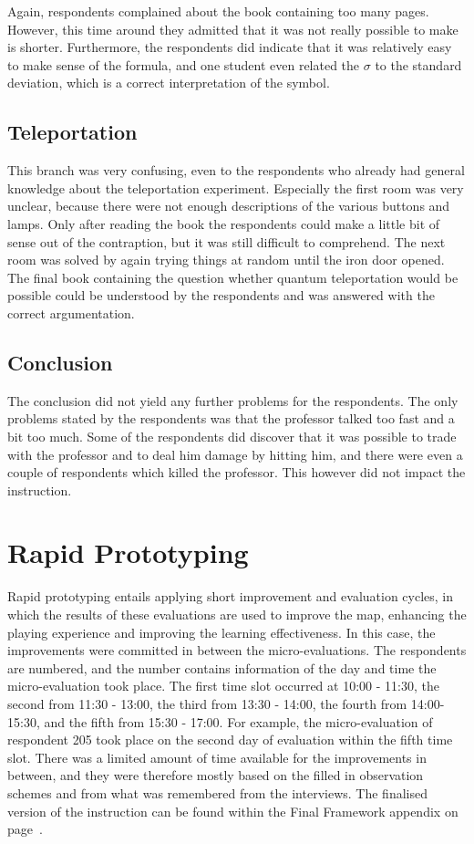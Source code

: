 \documentclass[11pt,twoside]{report} %
\begin{document}
Again, respondents complained about the book containing too many pages. However, this time around they admitted that it was not really possible to make is shorter. Furthermore, the respondents did indicate that it was relatively easy to make sense of the formula, and one student even related the $\sigma$ to the standard deviation, which is a correct interpretation of the symbol.

\subsection{Teleportation}

This branch was very confusing, even to the respondents who already had general knowledge about the teleportation experiment. Especially the first room was very unclear, because there were not enough descriptions of the various buttons and lamps. Only after reading the book the respondents could make a little bit of sense out of the contraption, but it was still difficult to comprehend. The next room was solved by again trying things at random until the iron door opened. The final book containing the question whether quantum teleportation would be possible could be understood by the respondents and was answered with the correct argumentation.

\subsection{Conclusion}

The conclusion did not yield any further problems for the respondents. The only problems stated by the respondents was that the professor talked too fast and a bit too much. Some of the respondents did discover that it was possible to trade with the professor and to deal him damage by hitting him, and there were even a couple of respondents which killed the professor. This however did not impact the instruction.

\section{Rapid Prototyping}

Rapid prototyping entails applying short improvement and evaluation cycles, in which the results of these evaluations are used to improve the map, enhancing the playing experience and improving the learning effectiveness. In this case, the improvements were committed in between the micro-evaluations. The respondents are numbered, and the number contains information of the day and time the micro-evaluation took place. The first time slot occurred at 10:00 - 11:30, the second from 11:30 - 13:00, the third from 13:30 - 14:00, the fourth from 14:00-15:30, and the fifth from 15:30 - 17:00. For example, the micro-evaluation of respondent 205 took place on the second day of evaluation within the fifth time slot. There was a limited amount of time available for the improvements in between, and they were therefore mostly based on the filled in observation schemes and from what was remembered from the interviews. The finalised version of the instruction can be found within the Final Framework appendix on page~\pageref{framework2}.
\end{document}
